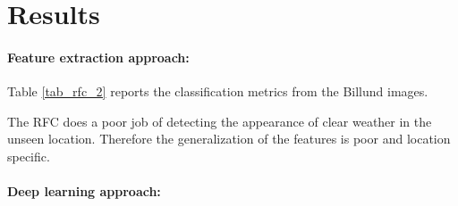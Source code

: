 \documentclass[
    ,title     = {{Methods for image classification}}
    ,longtitle
    ,highlight = dtured
    ,toplogo   = {{template/tex_dtu_compute_b_uk}}
    ,botlogo   = {{template/tex_dtu_frise}}
    ,papersize = {{a0paper}}
    ,colcount  = {{3columns}}
]{dtuposter}
\begin{document}
\begin{minipage}[t]{0.30\textwidth}
\section*{Results}
\paragraph{Feature extraction approach:}
Table \ref{tab_rfc_2} reports the classification metrics from the Billund images. 

\begin{table}
\centering
{}
\caption{Performance metrics of predicting the appearance of fog in an unseen location. All values are in percentage.}
\label{tab_rfc_2}
\end{table}

The RFC does a poor job of detecting the appearance of clear weather in the unseen location. Therefore the generalization of the features is poor and location specific. 

\paragraph{Deep learning approach:}

\begin{table}
\centering
{}
\caption{Performance metrics of predicting the appearance of fog. All values are in percentage.}
\label{tab_conv_1}
\end{table}


\end{minipage}
\end{document}
